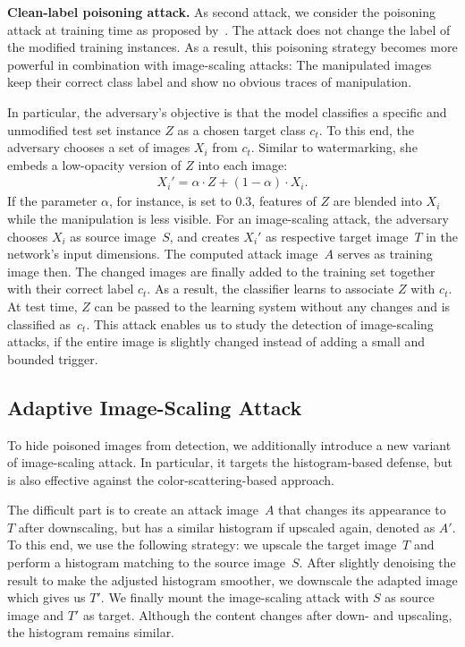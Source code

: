 \documentclass[conference]{IEEEtran}
\renewcommand{\paragraph}[1]{{\vskip 8pt \noindent\bf #1 }}
\newcommand{\srcimg}{\ensuremath{S}\xspace}
\newcommand{\tarimg}{\ensuremath{T}\xspace}
\newcommand{\attimg}{\ensuremath{A}\xspace}
\newcommand{\ti}{\ensuremath{Z}\xspace}
\begin{document}
\paragraph{Clean-label poisoning attack.}
As second attack, we consider the poisoning attack at training time as 
proposed by~\citet{ShaHuaNaj+18}. The attack does not change the label 
of the modified training instances. As a result, this poisoning 
strategy becomes more powerful in combination with image-scaling 
attacks: The manipulated images keep their correct class label and 
show no obvious traces of manipulation. 


In particular, the adversary's objective is that the model 
classifies a specific and unmodified test set instance $\ti$ as a 
chosen target class $c_t$. To this end, the adversary chooses a set of 
images $X_i$ from $c_t$. Similar to watermarking, she embeds a 
low-opacity version of \ti into each image:
\begin{align}
X_i' = \alpha \cdot \ti + (1-\alpha) \cdot X_i .
\end{align}
If the parameter $\alpha$, for instance, is set to 0.3, features of 
$\ti$ are blended into $X_i$ while the manipulation is less 
visible. 
For an image-scaling attack, the adversary chooses $X_i$ as 
source image~\srcimg, and creates $X_i'$ as respective target 
image~\tarimg in the network's input dimensions. The computed attack 
image~\attimg serves as training image then.
The changed images are finally added to the training set together with 
their correct label $c_t$. As a result, the classifier learns to 
associate $\ti$ with $c_t$. At test time, $\ti$ can be passed to the 
learning system without any changes and is classified as~$c_t$. 
This attack enables us to study the detection of image-scaling attacks, 
if the entire image is slightly changed instead of adding a small and 
bounded trigger.




\subsection{Adaptive Image-Scaling Attack}
To hide poisoned images from detection, we additionally introduce a new 
variant of image-scaling attack. In particular, it targets the 
histogram-based defense, but is also effective against the 
color-scattering-based approach.

The difficult part is to create an attack image~\attimg that changes 
its appearance to~\tarimg after downscaling, but has a similar 
histogram if upscaled again, denoted as $\attimg'$.
To this end, we use the following strategy: we upscale the 
target image~\tarimg and perform a histogram matching to the source 
image~\srcimg. After slightly denoising the result to make the adjusted 
histogram smoother, we downscale the adapted image which gives us 
$\tarimg'$. We finally mount the image-scaling attack with \srcimg 
as source image and $\tarimg'$ as target. Although the content 
changes after down- and upscaling, the histogram remains similar.
\end{document}
